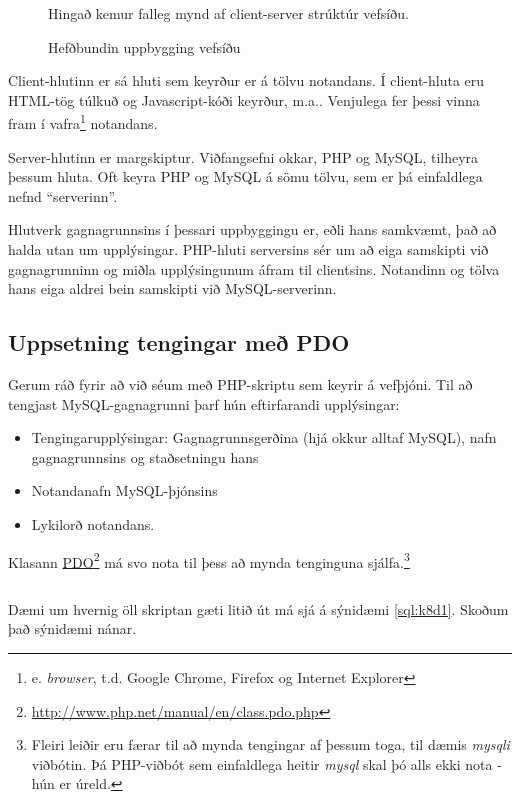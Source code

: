 \begin{figure}
\centering
\caption{Hefðbundin uppbygging vefsíðu}
\label{mynd:uppbyggingvefsidu}
\color{red} Hingað kemur falleg mynd af client-server strúktúr vefsíðu.
\end{figure}

Client-hlutinn er sá hluti sem keyrður er á tölvu notandans. Í client-hluta eru HTML-tög túlkuð og Javascript-kóði keyrður, m.a.. Venjulega fer þessi vinna fram í vafra\footnote{e. \emph{browser}, t.d. Google Chrome, Firefox og Internet Explorer} notandans.

Server-hlutinn er margskiptur. Viðfangsefni okkar, PHP og MySQL, tilheyra þessum hluta. Oft keyra PHP og MySQL á sömu tölvu, sem er þá einfaldlega nefnd ``serverinn''.

Hlutverk gagnagrunnsins í þessari uppbyggingu er, eðli hans samkvæmt, það að halda utan um upplýsingar. PHP-hluti serversins sér um að eiga samskipti við gagnagrunninn og miðla upplýsingunum áfram til clientsins. Notandinn og tölva hans eiga aldrei bein samskipti við MySQL-serverinn.

\subsection{Uppsetning tengingar með PDO}
Gerum ráð fyrir að við séum með PHP-skriptu sem keyrir á vefþjóni. Til að tengjast MySQL-gagnagrunni þarf hún eftirfarandi upplýsingar:
\begin{itemize}
 \item Tengingarupplýsingar: Gagnagrunnsgerðina (hjá okkur alltaf MySQL), nafn gagnagrunnsins og staðsetningu hans
 \item Notandanafn MySQL-þjónsins
 \item Lykilorð notandans.
\end{itemize}
Klasann \href{http://www.php.net/manual/en/class.pdo.php}{PDO}\footnote{\url{http://www.php.net/manual/en/class.pdo.php}} má svo nota til þess að mynda tenginguna sjálfa.\footnote{Fleiri leiðir eru færar til að mynda tengingar af þessum toga, til dæmis \emph{mysqli} viðbótin. Þá PHP-viðbót sem einfaldlega heitir \emph{mysql} skal þó alls ekki nota - hún er úreld.}

\begin{example}[h]
\caption{Tenging við gagnagrunn með PDO}
\label{sql:k8d1}
\centering
\inputminted[frame=lines, fontfamily=courier]{php}{php/k8d1.php}
\end{example}

Dæmi um hvernig öll skriptan gæti litið út má sjá á sýnidæmi \ref{sql:k8d1}. Skoðum það sýnidæmi nánar. 

